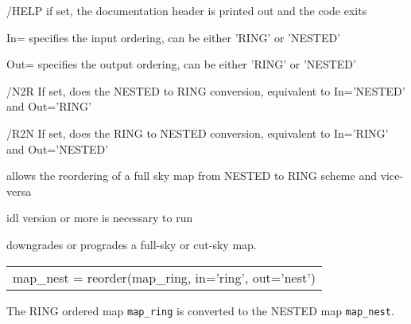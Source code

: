\begin{keywords}
  \begin{kwlist}{} %
	\item[{/HELP}]	 
	if set, the documentation header is printed out and the code exits

 	\item[{In=}] 
	specifies the input ordering, can be either 'RING' or 'NESTED'

       \item[{Out=}]
	specifies the output ordering, can be either 'RING' or 'NESTED'

 	\item[{/N2R}] 
	  If set, does the NESTED to RING conversion, equivalent to In='NESTED'
	  and Out='RING' 

 	\item[{/R2N}] 
	  If set, does the RING to NESTED conversion, equivalent to 
In='RING' and Out='NESTED'
   \end{kwlist}
\end{keywords}

\begin{codedescription}
{\facname allows the reordering of a full sky map from NESTED to RING
scheme and vice-versa}
\end{codedescription}



\begin{related}
  \begin{sulist}{} %
  \item[idl] version \idlversion or more is necessary to run \facname
  \item[\htmlref{ud\_grade}{idl:ud_grade}]  downgrades or progrades a full-sky
or cut-sky \healpix map.
\end{sulist}
\end{related}


\begin{example}
{
\begin{tabular}{l} %
map\_nest = reorder(map\_ring, in='ring', out='nest') \\
\end{tabular}
}
{The RING ordered map {\tt map\_ring} is converted to the 
NESTED map {\tt map\_nest}.
}
\end{example}


